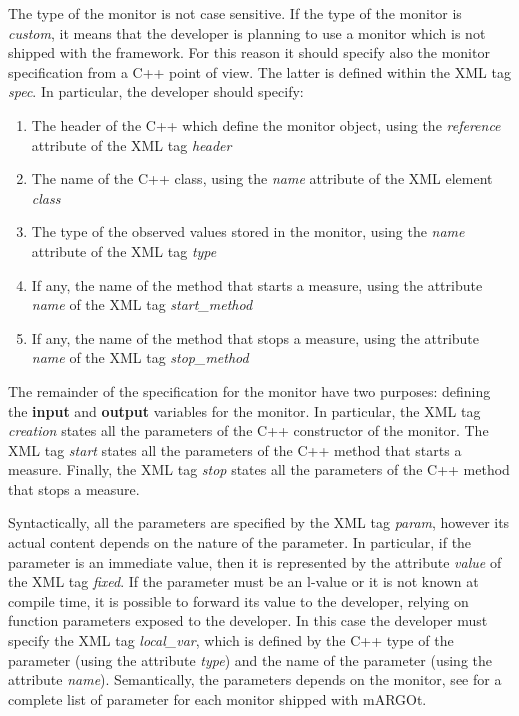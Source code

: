 The type of the monitor is not case sensitive.
If the type of the monitor is \textit{custom}, it means that the developer is planning to use a monitor which is not shipped with the framework.
For this reason it should specify also the monitor specification from a C++ point of view.
The latter is defined within the XML tag \textit{spec}.
In particular, the developer should specify:
\begin{enumerate}
	\item The header of the C++ which define the monitor object, using the \textit{reference} attribute of the XML tag \textit{header}
	\item The name of the C++ class, using the \textit{name} attribute of the XML element \textit{class}
	\item The type of the observed values stored in the monitor, using the \textit{name} attribute of the XML tag \textit{type}
	\item If any, the name of the method that starts a measure, using the attribute \textit{name} of the XML tag \textit{start\_method}
	\item If any, the name of the method that stops a measure, using the attribute \textit{name} of the XML tag \textit{stop\_method}
\end{enumerate}

The remainder of the specification for the monitor have two purposes: defining the \textbf{input} and \textbf{output} variables for the monitor.
In particular, the XML tag \textit{creation} states all the parameters of the C++ constructor of the monitor.
The XML tag \textit{start} states all the parameters of the C++ method that starts a measure.
Finally, the XML tag \textit{stop} states all the parameters of the C++ method that stops a measure.

Syntactically, all the parameters are specified by the XML tag \textit{param}, however its actual content depends on the nature of the parameter.
In particular, if the parameter is an immediate value, then it is represented by the attribute \textit{value} of the XML tag \textit{fixed}.
If the parameter must be an l-value or it is not known at compile time, it is possible to forward its value to the developer, relying on function parameters exposed to the developer.
In this case the developer must specify the XML tag \textit{local\_var}, which is defined by the C++ type of the parameter (using the attribute \textit{type}) and the name of the parameter (using the attribute \textit{name}).
Semantically, the parameters depends on the monitor, see  for a complete list of parameter for each monitor shipped with mARGOt.

